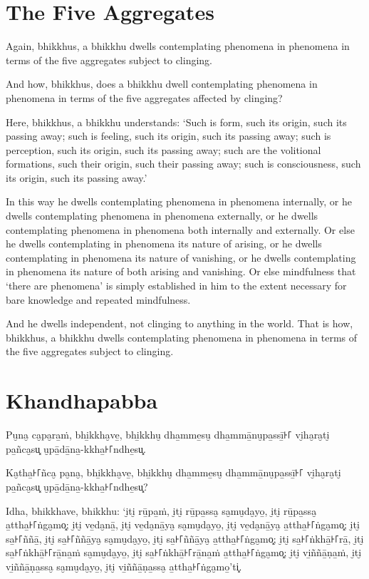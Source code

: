 
\englishPage
\section{The Five Aggregates}

Again, bhikkhus, a bhikkhu dwells contemplating phenomena in phenomena in terms
of the five aggregates subject to clinging.

And how, bhikkhus, does a bhikkhu dwell contemplating phenomena in phenomena in
terms of the five aggregates affected by clinging?

Here, bhikkhus, a bhikkhu understands:
`Such is form, such its origin, such its passing away;
such is feeling, such its origin, such its passing away;
such is perception, such its origin, such its passing away;
such are the volitional formations, such their origin, such their passing away;
such is consciousness, such its origin, such its passing away.'

In this way he dwells contemplating phenomena in phenomena internally, or he
dwells contemplating phenomena in phenomena externally, or he dwells
contemplating phenomena in phenomena both internally and externally. Or else he
dwells contemplating in phenomena its nature of arising, or he dwells
contemplating in phenomena its nature of vanishing, or he dwells contemplating
in phenomena its nature of both arising and vanishing. Or else mindfulness that
‘there are phenomena’ is simply established in him to the extent necessary for
bare knowledge and repeated mindfulness.

And he dwells independent, not clinging to anything in the world. That is how,
bhikkhus, a bhikkhu dwells contemplating phenomena in phenomena in terms of the
five aggregates subject to clinging.


\paliPage
\section*{Khandhapabba}

Pu̮na̮ ca̮pa̮ra̱ṁ, bhi̱kkha̮ve̱, bhi̱kkhu̮ dha̱mme̱su̮ dha̱mmā̱nu̮pa̱ssī̱꜔꜒ vi̮ha̮ra̮ti̮ pa̱ñca̮su͓
u̮pā̱dā̱na̱-kkha̱꜔꜒ndhe̱su͓.

Ka̮tha̱꜔꜒ñca̮ pa̮na̮, bhi̱kkha̮ve̱, bhi̱kkhu̮ dha̱mme̱su̮ dha̱mmā̱nu̮pa̱ssī̱꜔꜒ vi̮ha̮ra̮ti̮ pa̱ñca̮su͓
u̮pā̱dā̱na̱-kkha̱꜔꜒ndhe̱su͓?

Idha, bhikkhave, bhikkhu:
‘i̮ti̮ rū̱pa̱ṁ, i̮ti̮ rū̱pa̱ssa̮ sa̮mu̮da̮yo̱, i̮ti̮ rū̱pa̱ssa̮ a̱ttha̱꜔꜒ṅga̮mo͓;
i̮ti̮ ve̱da̮nā̱, i̮ti̮ ve̱da̮nā̱ya̮ sa̮mu̮da̮yo̱, i̮ti̮ ve̱da̮nā̱ya̮ a̱ttha̱꜔꜒ṅga̮mo͓;
i̮ti̮ sa̱꜔꜒ññā̱, i̮ti̮ sa̱꜔꜒ññā̱ya̮ sa̮mu̮da̮yo̱, i̮ti̮ sa̱꜔꜒ññā̱ya̮ a̱ttha̱꜔꜒ṅga̮mo͓;
i̮ti̮ sa̱꜔꜒ṅkhā̱꜔꜒rā̱, i̮ti̮ sa̱꜔꜒ṅkhā̱꜔꜒rā̱na̱ṁ sa̮mu̮da̮yo̱, i̮ti̮ sa̱꜔꜒ṅkhā̱꜔꜒rā̱na̱ṁ a̱ttha̱꜔꜒ṅga̮mo͓;
i̮ti̮ vi̱ññā̱ṇa̱ṁ, i̮ti̮ vi̱ññā̱ṇa̱ssa̮ sa̮mu̮da̮yo̱, i̮ti̮ vi̱ññā̱ṇa̱ssa̮ a̱ttha̱꜔꜒ṅga̮mo̱’ti͓.

